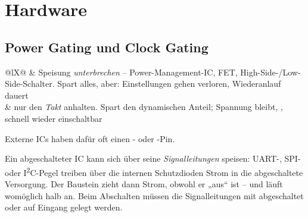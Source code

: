 \section{Hardware}
\label{sec:pwrhw}

\subsection{Power Gating und Clock Gating}
\label{rez:gating}
\begin{ztab}{@{}lX@{}}
 & Speisung \emph{unterbrechen} -- Power-Management-IC,
  FET, High-Side-/Low-Side-Schalter. Spart alles, aber:
  Einstellungen gehen verloren, Wiederanlauf dauert \\
 & nur den \emph{Takt} anhalten. Spart den dynamischen
  Anteil; Spannung bleibt, , schnell
  wieder einschaltbar \\
\end{ztab}
Externe ICs haben dafür oft einen - oder -Pin.
\begin{falle}
Ein abgeschalteter IC kann sich über seine \emph{Signalleitungen}
speisen: UART-, SPI- oder I\textsuperscript{2}C-Pegel treiben über die
internen Schutzdioden Strom in die abgeschaltete Versorgung. Der Baustein
zieht dann Strom, obwohl er „aus“ ist -- und läuft womöglich halb an.
Beim Abschalten müssen die Signalleitungen mit abgeschaltet oder auf
Eingang gelegt werden.
\end{falle}

